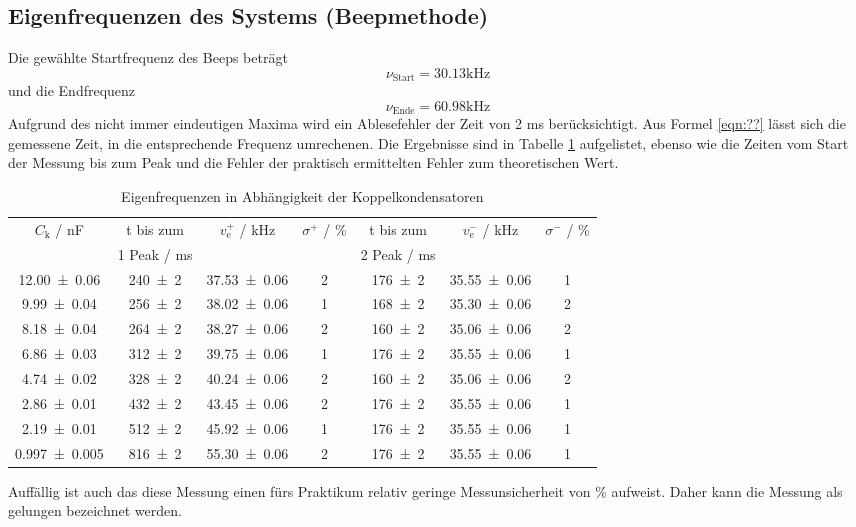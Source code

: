 \subsection{Eigenfrequenzen des Systems (Beepmethode)}
Die gewählte Startfrequenz des Beeps beträgt
\begin{equation}
  \nu_\text{Start} = 30.13 \text{kHz}
\end{equation}
und die Endfrequenz
\begin{equation}
  \nu_\text{Ende} = 60.98 \text{kHz}
\end{equation}
Aufgrund des nicht immer eindeutigen Maxima wird ein Ablesefehler der Zeit von 2 ms berücksichtigt. Aus Formel \ref{eqn:??} lässt sich die gemessene Zeit, in die entsprechende Frequenz umrechenen. Die Ergebnisse sind in Tabelle \ref{tab:beep} aufgelistet, ebenso wie die Zeiten vom Start der Messung bis zum Peak und die Fehler der praktisch ermittelten Fehler zum theoretischen Wert.
\begin{table}
  \centering
  \begin{tabular}{c c c c c c c}
    \toprule
    $C_\text{k}$ / nF & t bis zum & $v_\text{e}^+$ / kHz & $\sigma^+$ / \% & t bis zum & $v_\text{e}^-$ / kHz & $\sigma^-$ / \%  \\
    &1 Peak / ms& & & 2 Peak / ms & & \\
    \midrule
    \num{12.00 +- 0.06}     & \num{240 +- 2} &\num{37.53 +- 0.06} & 2 & \num{176 +- 2} & \num{35.55 +- 0.06} & 1 \\
    \num{9.99 +- 0.04}      & \num{256 +- 2} &\num{38.02 +- 0.06} & 1 & \num{168 +- 2} & \num{35.30 +- 0.06} & 2 \\
    \num{8.18 +- 0.04}      & \num{264 +- 2} &\num{38.27 +- 0.06} & 2 & \num{160 +- 2} & \num{35.06 +- 0.06} & 2 \\
    \num{6.86 +- 0.03}      & \num{312 +- 2} &\num{39.75 +- 0.06} & 1 & \num{176 +- 2} & \num{35.55 +- 0.06} & 1 \\
    \num{4.74 +- 0.02}      & \num{328 +- 2} &\num{40.24 +- 0.06} & 2 & \num{160 +- 2} & \num{35.06 +- 0.06} & 2 \\
    \num{2.86 +- 0.01}      & \num{432 +- 2} &\num{43.45 +- 0.06} & 2 & \num{176 +- 2} & \num{35.55 +- 0.06} & 1 \\
    \num{2.19 +- 0.01}      & \num{512 +- 2} &\num{45.92 +- 0.06} & 1 & \num{176 +- 2} & \num{35.55 +- 0.06} & 1 \\
    \num{0.997 +- 0.005}    & \num{816 +- 2} &\num{55.30 +- 0.06} & 2 & \num{176 +- 2} & \num{35.55 +- 0.06} & 1 \\
    \bottomrule
  \end{tabular}
  \caption{Eigenfrequenzen in Abhängigkeit der Koppelkondensatoren}
  \label{tab:beep}
\end{table}
Auffällig ist auch das diese Messung einen fürs Praktikum relativ geringe Messunsicherheit von  \% aufweist. Daher kann die Messung als gelungen bezeichnet werden.
